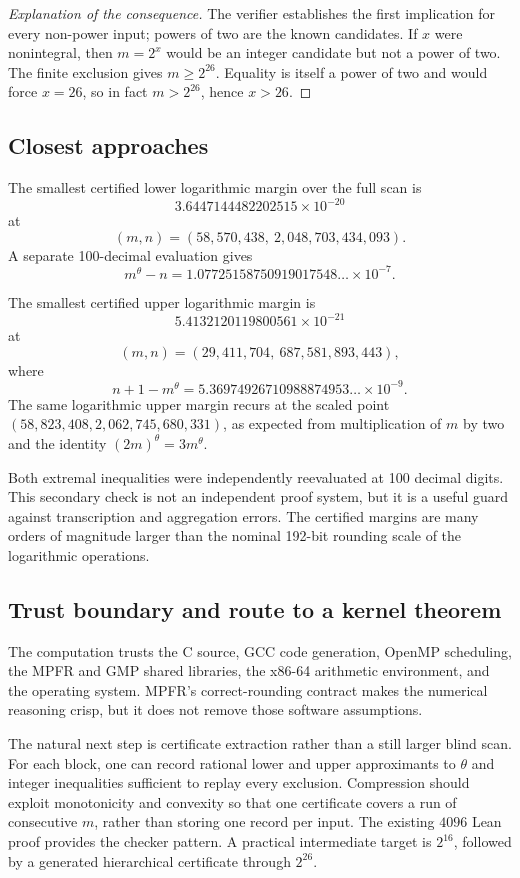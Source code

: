 \documentclass[11pt,oneside]{article}
\theoremstyle{definition}
\begin{document}
\begin{proof}[Explanation of the consequence]
The verifier establishes the first implication for every non-power input; powers of two are
the known candidates.  If \(x\) were nonintegral, then \(m=2^x\) would be an integer
candidate but not a power of two.  The finite exclusion gives \(m\ge2^{26}\).  Equality is
itself a power of two and would force \(x=26\), so in fact \(m>2^{26}\), hence \(x>26\).
\end{proof}

\subsection{Closest approaches}

The smallest certified lower logarithmic margin over the full scan is
\[
  3.6447144482202515\times10^{-20}
\]
at
\[
  (m,n)=(58{,}570{,}438,\ 2{,}048{,}703{,}434{,}093).
\]
A separate 100-decimal evaluation gives
\[
  m^\theta-n
  =1.07725158750919017548\ldots\times10^{-7}.
\]

The smallest certified upper logarithmic margin is
\[
  5.4132120119800561\times10^{-21}
\]
at
\[
  (m,n)=(29{,}411{,}704,\ 687{,}581{,}893{,}443),
\]
where
\[
  n+1-m^\theta
  =5.36974926710988874953\ldots\times10^{-9}.
\]
The same logarithmic upper margin recurs at the scaled point
\((58{,}823{,}408,2{,}062{,}745{,}680{,}331)\), as expected from multiplication of
\(m\) by two and the identity \((2m)^\theta=3m^\theta\).

Both extremal inequalities were independently reevaluated at 100 decimal digits.  This
secondary check is not an independent proof system, but it is a useful guard against
transcription and aggregation errors.  The certified margins are many orders of magnitude
larger than the nominal 192-bit rounding scale of the logarithmic operations.

\subsection{Trust boundary and route to a kernel theorem}

The computation trusts the C source, GCC code generation, OpenMP scheduling, the MPFR and
GMP shared libraries, the x86-64 arithmetic environment, and the operating system.  MPFR's
correct-rounding contract makes the numerical reasoning crisp, but it does not remove
those software assumptions.

The natural next step is certificate extraction rather than a still larger blind scan.
For each block, one can record rational lower and upper approximants to \(\theta\) and
integer inequalities sufficient to replay every exclusion.  Compression should exploit
monotonicity and convexity so that one certificate covers a run of consecutive \(m\),
rather than storing one record per input.  The existing \(4096\) Lean proof provides the
checker pattern.  A practical intermediate target is \(2^{16}\), followed by a generated
hierarchical certificate through \(2^{26}\).
\end{document}
